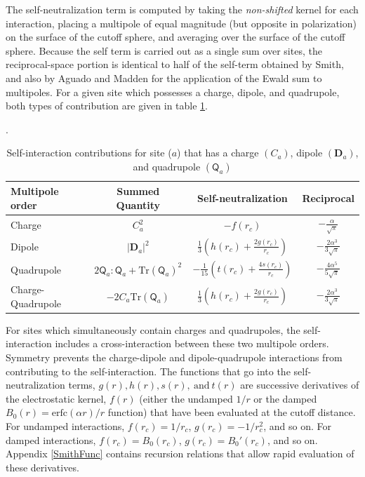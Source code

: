 The self-neutralization term is computed by taking the {\it
  non-shifted} kernel for each interaction, placing a multipole of
equal magnitude (but opposite in polarization) on the surface of the
cutoff sphere, and averaging over the surface of the cutoff sphere.
Because the self term is carried out as a single sum over sites, the
reciprocal-space portion is identical to half of the self-term
obtained by Smith, and also by Aguado and Madden for the application
of the Ewald sum to multipoles.\cite{Smith82,Smith98,Aguado03} For a
given site which possesses a charge, dipole, and quadrupole, both types
of contribution are given in table \ref{tab:tableSelf}.

\begin{table}
  \caption{\label{tab:tableSelf} Self-interaction contributions for 
    site ($a$) that has a charge $(C_a)$, dipole
    $(\mathbf{D}_a)$, and quadrupole $(\mathsf{Q}_a)$}.
\begin{ruledtabular}
\begin{tabular}{lccc}
Multipole order & Summed Quantity & Self-neutralization  & Reciprocal \\ \hline
Charge & $C_a^2$ & $-f(r_c)$ & $-\frac{\alpha}{\sqrt{\pi}}$ \\
Dipole & $|\mathbf{D}_a|^2$ & $\frac{1}{3} \left( h(r_c) +
  \frac{2 g(r_c)}{r_c} \right)$ & $-\frac{2 \alpha^3}{3 \sqrt{\pi}}$\\
Quadrupole & $2 \mathsf{Q}_a:\mathsf{Q}_a + \text{Tr}(\mathsf{Q}_a)^2$ &
$- \frac{1}{15} \left( t(r_c)+ \frac{4 s(r_c)}{r_c} \right)$ &
$-\frac{4 \alpha^5}{5 \sqrt{\pi}}$ \\
Charge-Quadrupole & $-2 C_a \text{Tr}(\mathsf{Q}_a)$ & $\frac{1}{3} \left(
  h(r_c) + \frac{2 g(r_c)}{r_c} \right)$& $-\frac{2 \alpha^3}{3 \sqrt{\pi}}$ \\
\end{tabular}
\end{ruledtabular}
\end{table}

For sites which simultaneously contain charges and quadrupoles, the
self-interaction includes a cross-interaction between these two
multipole orders.  Symmetry prevents the charge-dipole and
dipole-quadrupole interactions from contributing to the
self-interaction.  The functions that go into the self-neutralization
terms, $g(r), h(r), s(r), \mathrm{~and~} t(r)$ are successive
derivatives of the electrostatic kernel, $f(r)$ (either the undamped
$1/r$ or the damped $B_0(r)=\mathrm{erfc}(\alpha r)/r$ function) that
have been evaluated at the cutoff distance.  For undamped
interactions, $f(r_c) = 1/r_c$, $g(r_c) = -1/r_c^{2}$, and so on.  For
damped interactions, $f(r_c) = B_0(r_c)$, $g(r_c) = B_0'(r_c)$, and so
on.  Appendix \ref{SmithFunc} contains recursion relations that allow
rapid evaluation of these derivatives.

